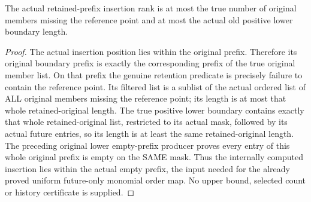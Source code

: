 \begin{theorem}
\label{hir:positive-member-empty-bound}
\leanok
The actual retained-prefix insertion rank is at most the true number of original members missing the reference point and at most the actual old positive lower boundary length.
\end{theorem}
\begin{proof}
The actual insertion position lies within the original prefix. Therefore its original boundary prefix is exactly the corresponding prefix of the true original member list. On that prefix the genuine retention predicate is precisely failure to contain the reference point. Its filtered list is a sublist of the actual ordered list of ALL original members missing the reference point; its length is at most that whole retained-original length. The true positive lower boundary contains exactly that whole retained-original list, restricted to its actual mask, followed by its actual future entries, so its length is at least the same retained-original length. The preceding original lower empty-prefix producer proves every entry of this whole original prefix is empty on the SAME mask. Thus the internally computed insertion lies within the actual empty prefix, the input needed for the already proved uniform future-only monomial order map. No upper bound, selected count or history certificate is supplied.
\end{proof}
